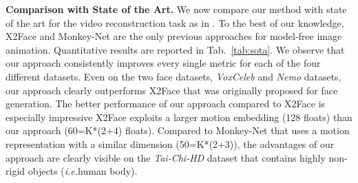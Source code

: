 \documentclass{article}
\def\ie{\textit{i.e.}}
\begin{document}
\textbf{Comparison with State of the Art.}
We now compare our method with state of the art for the video reconstruction task as in \cite{siarohin2018animating}. To the best of our knowledge, X2Face \cite{wiles2018x2face} and Monkey-Net \cite{siarohin2018animating} are the only previous approaches for model-free image animation. Quantitative results are reported in Tab.~\ref{tab:sota}. We observe that our approach consistently improves every single metric for each of the four different datasets. Even on the two face datasets, \emph{VoxCeleb} and \emph{Nemo} datasets, our approach clearly outperforms X2Face that was originally proposed for face generation. The better performance of our approach compared to X2Face is especially impressive X2Face exploits a larger motion embedding (128 floats) than our approach (60=K*(2+4) floats). Compared to Monkey-Net that uses a motion representation with a similar dimension (50=K*(2+3)), the advantages of our approach are clearly visible on the \emph{Tai-Chi-HD} dataset that contains highly non-rigid objects (\ie human body).
\end{document}
